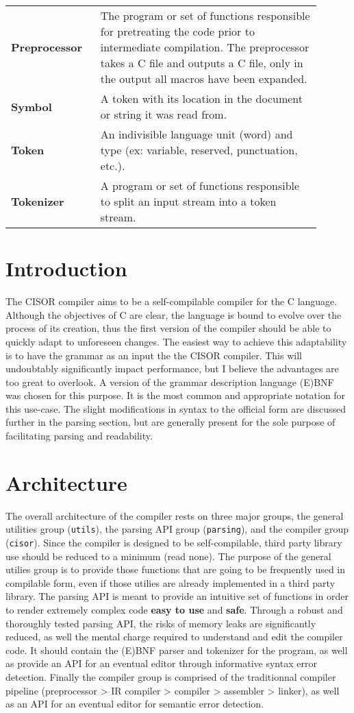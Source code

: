 \documentclass{article}
\newcommand{\csr}{C\raisebox{0.15em}{\textasteriskcentered}}
\begin{document}
\begin{longtable}{>{\bfseries}p{0.25\linewidth}p{0.65\linewidth}}
  Preprocessor & The program or set of functions responsible for pretreating the code prior to intermediate compilation. The preprocessor takes a \csr{} file and outputs a \csr{} file, only in the output all macros have been expanded.\\
  Symbol & A token with its location in the document or string it was read from.\\
  Token & An indivisible language unit (word) and type (ex: variable, reserved, punctuation, etc.).\\
  Tokenizer & A program or set of functions responsible to split an input stream into a token stream.
\end{longtable}

\pagebreak
{}

\section{Introduction}
The CISOR compiler aims to be a self-compilable compiler for the \csr{} language. Although the objectives of \csr{} are clear, the language is bound to evolve over the process of its creation, thus the first version of the compiler should be able to quickly adapt to unforeseen changes. The easiest way to achieve this adaptability is to have the grammar as an input the the CISOR compiler. This will undoubtably significantly impact performance, but I believe the advantages are too great to overlook. A version of the grammar description language (E)BNF was chosen for this purpose. It is the most common and appropriate notation for this use-case. The slight modifications in syntax to the official form are discussed further in the parsing section, but are generally present for the sole purpose of facilitating parsing and readability.

\section{Architecture}
The overall architecture of the compiler rests on three major groups, the general utilities group (\texttt{utils}), the parsing API group (\texttt{parsing}), and the compiler group (\texttt{cisor}). Since the compiler is designed to be self-compilable, third party library use should be reduced to a minimum (read none). The purpose of the general utilies group is to provide those functions that are going to be frequently used in compilable form, even if those utilies are already implemented in a third party library. The parsing API is meant to provide an intuitive set of functions in order to render extremely complex code \textbf{easy to use} and \textbf{safe}. Through a robust and thoroughly tested parsing API, the risks of memory leaks are significantly reduced, as well the mental charge required to understand and edit the compiler code. It should contain the (E)BNF parser and tokenizer for the program, as well as provide an API for an eventual editor through informative syntax error detection. Finally the compiler group is comprised of the traditionnal compiler pipeline (preprocessor > IR compiler > compiler > assembler > linker), as well as an API for an eventual editor for semantic error detection.

\begin{tikzpicture}
  
\end{tikzpicture}
\end{document}
